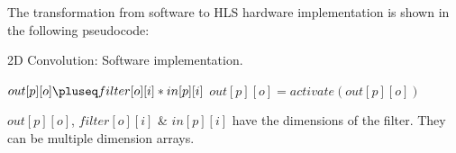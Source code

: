 The transformation from software to HLS hardware implementation is shown in the following pseudocode:
\begin{algorithm}[H]
    \caption[Conv2d Software implementation.]{2D Convolution: Software implementation.}
    \label{alg:Conv2d_SW}
    \begin{algorithmic}
                        \State $out[p][o] \pluseq filter[o][i] * in[p][i]$
                    \EndFor
                    \State $out[p][o] = activate(out[p][o])$
                \EndFor
            \EndFor
        \EndFunction
    \end{algorithmic}
    $out[p][o]$, $filter[o][i]$ \& $in[p][i]$ have the dimensions of the filter. They can be multiple dimension arrays.
\end{algorithm}

